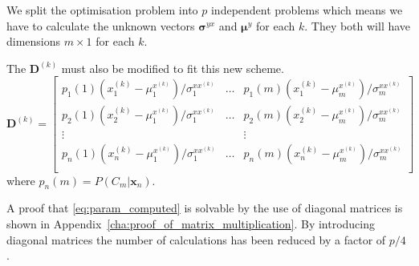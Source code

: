 We split the optimisation problem into $p$ independent problems which means we have to calculate the unknown vectors $\boldsymbol{\sigma}^{yx}$ and $\boldsymbol{\mu}^{y}$ for each $k$. They both will have dimensions $m\times 1$ for each $k$.

The $\mathbf{D}^{(k)}$ must also be modified to fit this new scheme.
\begin{equation}
	\label{eq:D_matrix_new}
	\mathbf{D}^{(k)} = \begin{bmatrix}
		p_1(1)(x_1^{(k)} - \mu_1^{x^{(k)}})/\sigma_1^{xx^{(k)}} & \dots & p_1(m)(x_1^{(k)} - \mu_m^{x^{(k)}})/\sigma_m^{xx^{(k)}} \\
		p_2(1)(x_2^{(k)} - \mu_1^{x^{(k)}})/\sigma_1^{xx^{(k)}} & \dots & p_2(m)(x_2^{(k)} - \mu_m^{x^{(k)}})/\sigma_m^{xx^{(k)}} \\
		\vdots & & \vdots \\
		p_n(1)(x_n^{(k)} - \mu_1^{x^{(k)}})/\sigma_1^{xx^{(k)}} & \dots & p_n(m)(x_n^{(k)} - \mu_m^{x^{(k)}})/\sigma_m^{xx^{(k)}} \\
	\end{bmatrix}
\end{equation}
where $p_n(m)=P(C_m\vert \mathbf{x}_n)$.

A proof that \eqref{eq:param_computed} is solvable by the use of diagonal matrices is shown in Appendix~\ref{cha:proof_of_matrix_multiplication}. By introducing diagonal matrices the number of calculations has been reduced by a factor of $p/4$ \cite{stylianou98}.


